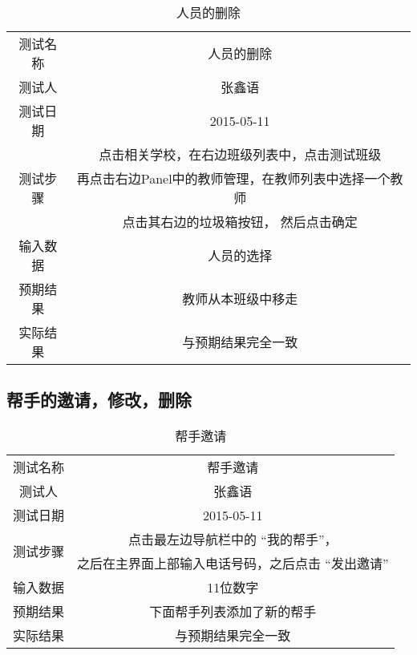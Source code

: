 \begin{table}[H]
  \centering
  \caption{人员的删除}
  \label{tab:9}
  \begin{tabular}{cc}
    \toprule
    测试名称 & 人员的删除  \\

    测试人 & 张鑫语 \\
    测试日期 & 2015-05-11 \\

    \midrule
   \multirow{3}{*}{测试步骤} 		& 点击相关学校，在右边班级列表中，点击测试班级 \\
    & 再点击右边Panel中的教师管理，在教师列表中选择一个教师 \\
    & 点击其右边的垃圾箱按钮， 然后点击确定 \\

    \midrule
    输入数据 		& 人员的选择 \\
    预期结果 		& 教师从本班级中移走 \\
    实际结果             & 与预期结果完全一致 \\
    \bottomrule
  \end{tabular}
\end{table}







\subsection{帮手的邀请，修改，删除}


\begin{table}[H]
  \centering
  \caption{帮手邀请}
  \label{tab:11}
  \begin{tabular}{cc}
    \toprule
    测试名称 & 帮手邀请  \\

    测试人 & 张鑫语 \\
    测试日期 & 2015-05-11 \\

    \midrule
    \multirow{2}{*}{测试步骤} 		& 点击最左边导航栏中的 “我的帮手”，  \\
                                        & 之后在主界面上部输入电话号码，之后点击 “发出邀请” \\
    \midrule
    输入数据 		& 11位数字 \\
    预期结果 		& 下面帮手列表添加了新的帮手 \\
    实际结果             & 与预期结果完全一致 \\
    \bottomrule
  \end{tabular}
\end{table}


